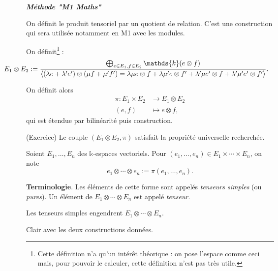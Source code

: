 \documentclass{../../notes}
\begin{document}
\begin{prv}
\begin{itemize}
        \begin{center}
          \textbf{\textit{Méthode "M1 Maths"}}
        \end{center}

        On définit le produit tensoriel par un quotient de relation.
        C'est une construction qui sera utilisée notamment en M1 avec les modules.

        On définit\footnote{Cette définition n'a qu'un intérêt théorique : on pose l'espace comme ceci mais, pour pouvoir le calculer, cette définition n'est pas très utile.} : {\footnotesize\[
            \hspace{-4em}
        E_1 \otimes E_2 := \frac{\bigoplus_{e \in E_1, f \in E_2} \mathds{k} (e \otimes f)}{\langle (\lambda e + \lambda' e') \otimes (\mu f + \mu' f') = \lambda \mu e \otimes f + \lambda \mu' e \otimes f' + \lambda' \mu e' \otimes f + \lambda' \mu' e' \otimes f' \rangle}
      .\]}

        On définit alors
        \begin{align*}
          \pi: E_1 \times E_2 &\longrightarrow E_1 \otimes E_2 \\
          (e, f) &\longmapsto \overline{e \otimes f}
        ,\end{align*}
        qui est étendue par bilinéarité puis construction.

        (Exercice) Le couple $(E_1 \otimes E_2, \pi)$ satisfait la propriété universelle recherchée.
    \end{itemize}
  \end{prv}


  \begin{defn}
    Soient $E_1, \ldots, E_n$ des $\mathds{k}$-espaces vectoriels.
    Pour $(e_1, \ldots, e_n) \in E_1 \times \cdots \times E_n$, on note \[
      e_1 \otimes \cdots \otimes e_n := \pi(e_1, \ldots, e_n)
    .\]
  \end{defn}

  \textbf{Terminologie}.
  Les éléments de cette forme sont appelés \textit{tenseurs simples} (ou \textit{pures}).
  Un élément de $E_1 \otimes \cdots \otimes E_n$ est appelé \textit{tenseur}.

  \begin{obs}
    Les tenseurs simples engendrent $E_1 \otimes \cdots \otimes E_n$.
  \end{obs}
  \begin{expl}
    Clair avec les deux constructions données.
  \end{expl}
\end{document}
